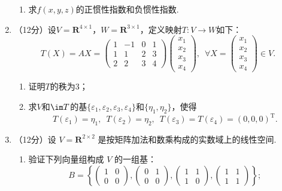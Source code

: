 \begin{enumerate}
\begin{enumerate}
        \item 求$f(x,y,z)$的正惯性指数和负惯性指数.
    \end{enumerate}
	\item （12分）设$V=\mathbf{R}^{4\times 1}$，$W=\mathbf{R}^{3\times 1}$，定义映射$T\colon V\to W$如下：
	\[T(X)=AX=\begin{pmatrix}
        1 & -1 & 0 & 1 \\ 1 & 1 & 2 & 3 \\ 2 & 2 & 3 & 4
    \end{pmatrix}\begin{pmatrix}
        x_1 \\ x_2 \\ x_3 \\ x_4
    \end{pmatrix},\enspace\forall X=\begin{pmatrix}
        x_1 \\ x_2 \\ x_3 \\ x_4
    \end{pmatrix}\in V.\]
    \begin{enumerate}
        \item 证明$T$的秩为3；

        \item 求$V$和$\im T$的基$\{\varepsilon_1,\varepsilon_2,\varepsilon_3,\varepsilon_4\}$和$\{\eta_1,\eta_2\}$，使得
        \[T(\varepsilon_1)=\eta_1,\enspace T(\varepsilon_2)=\eta_2,\enspace T(\varepsilon_3)=T(\varepsilon_4)=(0,0,0)^\mathrm{T}.\]
    \end{enumerate}
	\item （12分）设 $V=\mathbf{R}^{2 \times 2}$ 是按矩阵加法和数乘构成的实数域上的线性空间.
    \begin{enumerate}
        \item 验证下列向量组构成 $V$ 的一组基：
    \[B=\left\{\begin{pmatrix}
    1 & 0 \\ 0 & 0 \end{pmatrix},\begin{pmatrix}
    0 & 1 \\ 0 & 0 \end{pmatrix},\begin{pmatrix}
    1 & 1 \\ 1 & 0 \end{pmatrix},\begin{pmatrix}
    1 & 1 \\ 1 & 1 \end{pmatrix}\right\};\]


\end{enumerate}
\end{enumerate}
